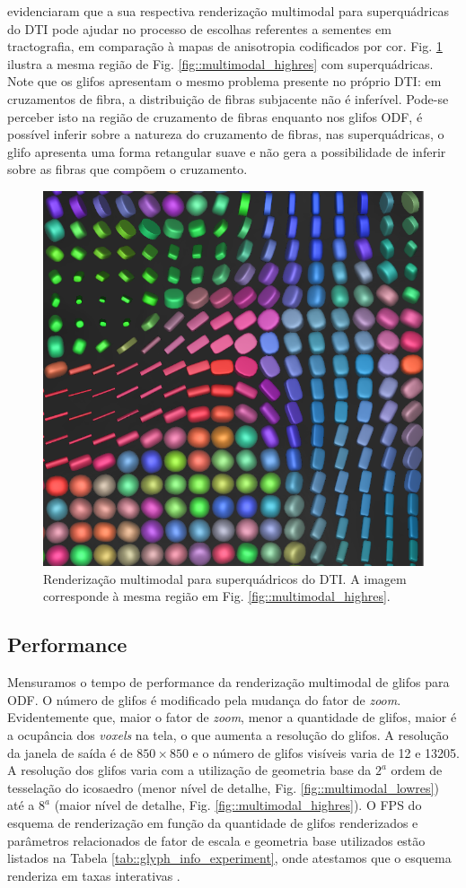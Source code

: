 \documentclass[
    12pt,                %
    oneside,            %
    a4paper,            %
    english,            %
    french,                %
    spanish,            %
    brazil                %
    ]{abntex2}
\begin{document}
 evidenciaram que a sua respectiva renderização multimodal para superquádricas do DTI pode ajudar no processo de escolhas referentes a sementes em tractografia, em comparação à mapas de anisotropia codificados por cor. Fig. \ref{fig::multimodal_superquadric} ilustra a mesma região de Fig. \ref{fig::multimodal_highres} com superquádricas. Note que os glifos apresentam o mesmo problema presente no próprio DTI: em cruzamentos de fibra, a distribuição de fibras subjacente não é inferível. Pode-se perceber isto na região de cruzamento de fibras enquanto nos glifos ODF, é possível inferir sobre a natureza do cruzamento de fibras, nas superquádricas, o glifo apresenta uma forma retangular suave e não gera a possibilidade de inferir sobre as fibras que compõem o cruzamento.


\begin{figure}[ht]
    \centering
    \includegraphics[width=.35\linewidth, angle=0]{figs/Esquema_Glifo/HighResImgSuperquadric.png}
    \caption{ Renderização multimodal para superquádricos do DTI. A imagem corresponde à mesma região em Fig. \ref{fig::multimodal_highres}.}
    \label{fig::multimodal_superquadric}
\end{figure}

\subsection{Performance}
\label{ssec::performance}

Mensuramos o tempo de performance da renderização multimodal de glifos para ODF. O número de glifos é modificado pela mudança do fator de \textit{zoom}. Evidentemente que, maior o fator de \textit{zoom}, menor a quantidade de glifos, maior é a ocupância dos \textit{voxels} na tela, o que aumenta a resolução do glifos. A resolução da janela de saída é de $850\times 850$ e o número de glifos visíveis varia de 12 e 13205. A resolução dos glifos varia com a utilização de geometria base da $2^a$ ordem de tesselação do icosaedro (menor nível de detalhe, Fig. \ref{fig::multimodal_lowres}) até a $8^a$ (maior nível de detalhe, Fig. \ref{fig::multimodal_highres}). O FPS do esquema de renderização em função da quantidade de glifos renderizados e parâmetros relacionados de fator de escala e geometria base utilizados estão listados na Tabela \ref{tab::glyph_info_experiment}, onde atestamos que o esquema renderiza em taxas interativas \cite{nielsen1994}.
\end{document}
